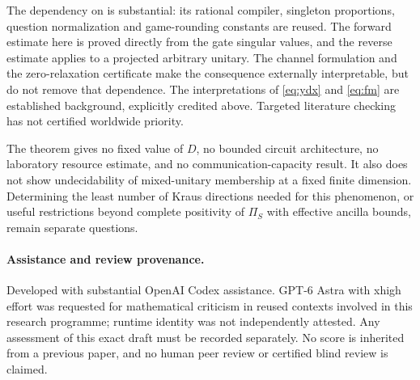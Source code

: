 \documentclass[11pt,a4paper]{article}
\begin{document}
The dependency on \cite{compiler} is substantial: its rational compiler, singleton proportions, question normalization and game-rounding constants are reused. The forward estimate here is proved directly from the gate singular values, and the reverse estimate applies to a projected arbitrary unitary. The channel formulation and the zero-relaxation certificate make the consequence externally interpretable, but do not remove that dependence. The interpretations of \eqref{eq:ydx} and \eqref{eq:fm} are established background, explicitly credited above. Targeted literature checking has not certified worldwide priority.

The theorem gives no fixed value of $D$, no bounded circuit architecture, no laboratory resource estimate, and no communication-capacity result. It also does not show undecidability of mixed-unitary membership at a fixed finite dimension. Determining the least number of Kraus directions needed for this phenomenon, or useful restrictions beyond complete positivity of $\Pi_S$ with effective ancilla bounds, remain separate questions.

\paragraph{Assistance and review provenance.}
Developed with substantial OpenAI Codex assistance. GPT-6 Astra with xhigh effort was requested for mathematical criticism in reused contexts involved in this research programme; runtime identity was not independently attested. Any assessment of this exact draft must be recorded separately. No score is inherited from a previous paper, and no human peer review or certified blind review is claimed.
\end{document}
